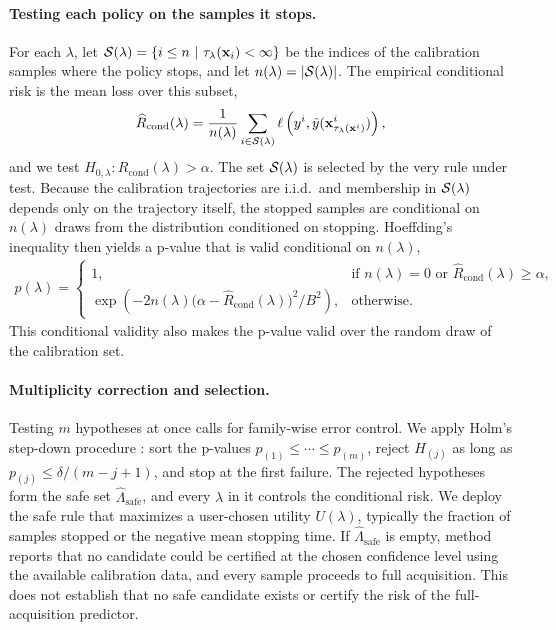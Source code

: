 \paragraph{Testing each policy on the samples it stops.}
For each $\lambda$, let $\mathcal{S}(\lambda) = \{ i \le n ~\vert~ \tau_\lambda(\mathbf{x}_i) < \infty \}$ be the indices of the calibration samples where the policy stops, and let $n(\lambda) = |\mathcal{S}(\lambda)|$. 
The empirical conditional risk is the mean loss over this subset,
\begin{align}
    \widehat{R}_{\text{cond}}(\lambda) = \frac{1}{n(\lambda)} \sum_{i \in \mathcal{S}(\lambda)} \ell\left(y^i, \hat{y}(\mathbf{x}^i_{ \tau_\lambda(\mathbf{x}^i)})\right),
\end{align}
and we test $H_{0,\lambda} : R_{\text{cond}}(\lambda) > \alpha$.
The set $\mathcal{S}(\lambda)$ is selected by the very rule under test. 
Because the calibration trajectories are i.i.d.\ and membership in $\mathcal{S}(\lambda)$ depends only on the trajectory itself, the stopped samples are conditional on $n(\lambda)$ draws from the distribution conditioned on stopping. 
Hoeffding's inequality then yields a p-value that is valid conditional on $n(\lambda)$,
\begin{align}
\label{eq:hoeffding_pvalue}
    p(\lambda) =
    \begin{cases}
        1, & \text{if } n(\lambda) = 0 \text{ or } \widehat{R}_{\text{cond}}(\lambda) \ge \alpha, \\[2pt]
        \exp\!\left(-2 n(\lambda)\big(\alpha - \widehat{R}_{\text{cond}}(\lambda)\big)^2 / B^2\right), & \text{otherwise}.
    \end{cases}
\end{align}
This conditional validity also makes the p-value valid over the random draw of the calibration set. 

\paragraph{Multiplicity correction and selection.}
Testing $m$ hypotheses at once calls for family-wise error control. We apply Holm's step-down procedure \citep{holm1979simple}: sort the p-values $p_{(1)} \le \cdots \le p_{(m)}$, reject $H_{(j)}$ as long as $p_{(j)} \le \delta/(m-j+1)$, and stop at the first failure. The rejected hypotheses form the safe set $\widehat{\Lambda}_{\text{safe}}$, and every $\lambda$ in it controls the conditional risk. We deploy the safe rule that maximizes a user-chosen utility $U(\lambda)$, typically the fraction of samples stopped or the negative mean stopping time. If $\widehat{\Lambda}_{\text{safe}}$ is empty, \gls{method} reports that no candidate could be certified at the chosen confidence level using the available calibration data, and every sample proceeds to full acquisition. This does not establish that no safe candidate exists or certify the risk of the full-acquisition predictor.

